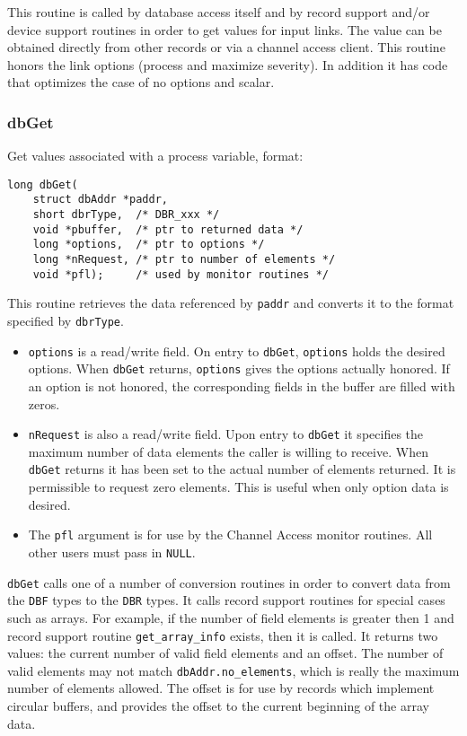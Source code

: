 This routine is called by database access itself and by record support and/or device support routines in order to get values for input links.
The value can be obtained directly from other records or via a channel access client.
This routine honors the link options (process and maximize severity).
In addition it has code that optimizes the case of no options and scalar.

\subsubsection{dbGet}

Get values associated with a process variable, format:

\begin{verbatim}
long dbGet(
    struct dbAddr *paddr,
    short dbrType,  /* DBR_xxx */
    void *pbuffer,  /* ptr to returned data */
    long *options,  /* ptr to options */
    long *nRequest, /* ptr to number of elements */
    void *pfl);     /* used by monitor routines */
\end{verbatim}

This routine retrieves the data referenced by \verb|paddr| and converts it to the format specified by \verb|dbrType|.

\begin{itemize}

\item \verb|options| is a read/write field.
On entry to \verb|dbGet|, \verb|options| holds the desired options.
When \verb|dbGet| returns, \verb|options| gives the options actually honored.
If an option is not honored, the corresponding fields in the buffer are filled with zeros.

\item \verb|nRequest| is also a read/write field.
Upon entry to \verb|dbGet| it specifies the maximum number of data elements the 
caller is willing to receive.
When \verb|dbGet| returns it has been set to the actual number of elements returned.
It is permissible to request zero elements.
This is useful when only option data is desired.

\item The \verb|pfl| argument is for use by the Channel Access monitor routines.
All other users must pass in \verb|NULL|.

\end{itemize}

\verb|dbGet| calls one of a number of conversion routines in order to convert data from the \verb|DBF| types to the \verb|DBR| types.
It calls record support routines for special cases such as arrays.
For example, if the number of field elements is greater then 1 and record support routine \verb|get_array_info| exists, then it is called.
It returns two values:
the current number of valid field elements and an offset.
The number of valid elements may not match \verb|dbAddr.no_elements|, which is really the maximum number of elements allowed.
The offset is for use by records which implement circular buffers, and provides the offset to the current beginning of the array data.

